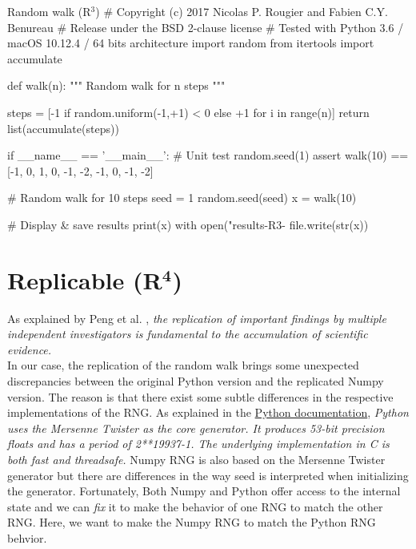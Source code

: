 \documentclass[a4paper,11pt]{article}
\begin{document}
\begin{code}{Random walk (R$^3$)}
# Copyright (c) 2017 Nicolas P. Rougier and Fabien C.Y. Benureau
# Release under the BSD 2-clause license
# Tested with Python 3.6 / macOS 10.12.4 / 64 bits architecture
import random
from itertools import accumulate

def walk(n):
    """ Random walk for n steps """

    steps = [-1 if random.uniform(-1,+1) < 0 else +1 for i in range(n)]
    return list(accumulate(steps))

if __name__ == '__main__':
    # Unit test
    random.seed(1)
    assert walk(10) == [-1, 0, 1, 0, -1, -2, -1, 0, -1, -2]

    # Random walk for 10 steps
    seed = 1
    random.seed(seed)
    x = walk(10)
    
    # Display & save results
    print(x)
    with open("results-R3-%
        file.write(str(x))
\end{code}


\clearpage
\section*{Replicable (R$^{\mathbf 4}$)}

As explained by Peng et al. \cite{Peng:2006}, {\em the replication of important findings by multiple independent investigators is fundamental to the accumulation of scientific evidence.}\\

In our case, the replication of the random walk brings some unexpected discrepancies between the original Python version and the replicated Numpy version.
The reason is that there exist some subtle differences in the respective implementations of the RNG.
As explained in the \href{https://docs.python.org/3.6/library/random.html}{Python documentation}, {\em Python uses the Mersenne Twister as the core generator. It produces 53-bit precision floats
and has a period of 2**19937-1.
The underlying implementation in C is both fast and threadsafe.}
Numpy RNG is also based on the Mersenne Twister generator but there are differences in the way seed is interpreted when initializing the generator.
Fortunately, Both Numpy and Python offer access to the internal state and we can {\em fix} it to make the behavior of one RNG to match the other RNG.
Here, we want to make the Numpy RNG to match the Python RNG behvior.
\end{document}
